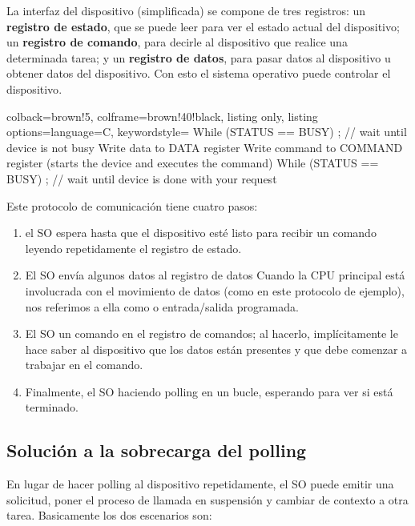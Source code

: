 \documentclass[openany]{book}
\begin{document}
La interfaz del dispositivo (simplificada) se compone de tres registros: un \textbf{registro de estado}, que se puede leer para ver el estado actual del dispositivo; un \textbf{registro de comando}, para decirle al dispositivo que realice una determinada tarea; y un \textbf{registro de datos}, para pasar datos al dispositivo u obtener datos del dispositivo. Con esto el sistema operativo puede \colorbox{yellow!20}{controlar el dispositivo}.

\begin{tcblisting}{colback=brown!5, colframe=brown!40!black, listing only, listing options={language=C, keywordstyle=\color{blue!35!white}\bfseries}}
While (STATUS == BUSY)
; // wait until device is not busy
Write data to DATA register
Write command to COMMAND register
(starts the device and executes the command)
While (STATUS == BUSY)
; // wait until device is done with your request
\end{tcblisting}

Este protocolo de comunicación tiene cuatro pasos:

\begin{enumerate}
    \item {} el SO espera hasta que el dispositivo esté listo para recibir un comando leyendo repetidamente el registro de estado.
    \item El SO envía algunos datos al registro de datos Cuando la CPU principal está involucrada con el movimiento de datos (como en este protocolo de ejemplo), nos referimos a ella como  o entrada/salida programada.
    \item El SO  un comando en el registro de comandos; al hacerlo, implícitamente le hace saber al dispositivo que los datos están presentes y que debe comenzar a trabajar en el comando.
    \item Finalmente, el SO  haciendo polling en un bucle, esperando para ver si está terminado.
\end{enumerate}

\subsection{Solución a la sobrecarga del polling}

En lugar de hacer polling al dispositivo repetidamente, el SO puede emitir una solicitud, poner el proceso de llamada en suspensión y cambiar de contexto a otra tarea. Basicamente los dos escenarios son:
\end{document}
